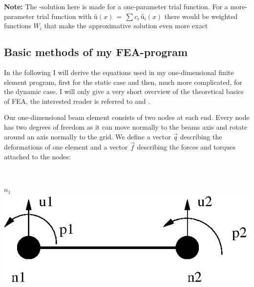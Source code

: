 {\bf Note:} The -solution here is made for a one-parameter trial function. For a more-parameter trial function with $û(x)\,=\,\sum c_i\,û_i(x)$ there would be weighted functions $W_i$ that make the approximative solution even more exact
\bigskip 

\subsection{Basic methods of my FEA-program}
In the following I will derive the equations used in my one-dimensional finite element program, first for the static case and then, much more complicated, for the dynamic case. I will only give a very short overview of the theoretical basics of FEA, the interested reader is referred to \cite{seshu} and \cite{ramamurty}.

\bigskip
\bigskip

\begin{minipage}{\textwidth}
    \begin{minipage}[t]{0.5\textwidth}
     
     Our one-dimensional beam element consists of two nodes at each end. Every node has two degrees of freedom as it can move normally to the beams axis and rotate around an axis normally to the grid. We define a vector $\vec{q}$  describing the deformations of one element and a vector $\vec{f}$ describing the forces and torques attached to the nodes:
    \end{minipage}
    \hfill
    \begin{minipage}[t]{0.5\textwidth}				%
      ~\\[-1ex]%
       
      \centerline{
       {$n_1$}
      \includegraphics[scale=1]{beamElement1.eps}}
    \end{minipage}
  \end{minipage}

